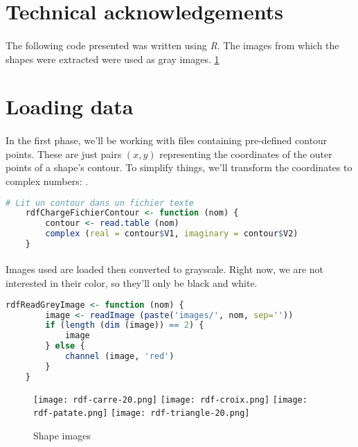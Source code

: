 \section{Technical acknowledgements}
\paragraph{}
The following code presented was written using \emph{R}. The images from which the shapes were extracted were used as gray images. \ref{fig:gray-images}

\section{Loading data}
\paragraph{}
In the first phase, we'll be working with files containing pre-defined contour points.
These are just pairs $(x, y)$ representing the coordinates of the outer points of a shape's contour.
To simplify things, we'll transform the coordinates to complex numbers: \cite{complex_number}.

\begin{lstlisting}[language=R, caption=Loading outer contour points]
    # Lit un contour dans un fichier texte
    rdfChargeFichierContour <- function (nom) {
        contour <- read.table (nom)
        complex (real = contour$V1, imaginary = contour$V2)
    }
\end{lstlisting}

\paragraph{}
Images used are loaded then converted to grayscale. Right now, we are not interested in their color, so they'll only be black and white.

\begin{lstlisting}[language=R, caption=Loading images]
    rdfReadGreyImage <- function (nom) {
        image <- readImage (paste('images/', nom, sep=''))
        if (length (dim (image)) == 2) {
            image
        } else {
            channel (image, 'red')
        }
    }
\end{lstlisting}

\begin{figure}[ht]
    \centering
    \texttt{[image: rdf-carre-20.png]}
    \texttt{[image: rdf-croix.png]}
    \texttt{[image: rdf-patate.png]}
    \texttt{[image: rdf-triangle-20.png]}
    \caption{Shape images}
    \label{fig:gray-images}
\end{figure}

